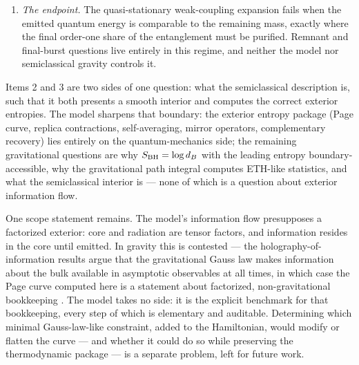 \documentclass[12pt]{article}
\newcommand{\Smicro}{S_{\rm micro}}
\begin{document}
\begin{enumerate}
the Cayley family --- would convert the per-step mixing assumption into a
derived consequence
of the dynamics and bind the complexity threshold
$\exp(\frac{1}{2}\Smicro)$ of Corollary~\ref{cor:accessibility-complexity}
to the temperature.  Separately, recovery and mirror operators
exist but are not feasibly accessible.
Proposition~\ref{prop:mirror-complexity}
gives the explicit complexity lower bound
$\exp(\frac{1}{2}\Smicro(E))$ for the radiation-supported mirror (tightened
to $\exp(\Smicro(E))$ by the Python's lunch), decreasing monotonically along
the trajectory but remaining exponential throughout the post-Page era.
Proposition~\ref{prop:no-go} and
Proposition~\ref{prop:mirror-complexity} are complementary: state independence
is forbidden algebraically, and state-dependent implementation costs
exponentially.
\item
\emph{The endpoint.}  The quasi-stationary weak-coupling expansion fails when
the emitted quantum energy is comparable to the remaining mass, exactly where
the final order-one share of the entanglement must be purified.  Remnant and
final-burst questions live entirely in this regime, and neither the model nor
semiclassical gravity controls it.
\end{enumerate}

Items 2 and 3 are two sides of one question: what the semiclassical
description is, such that it both presents a smooth interior and computes the
correct exterior entropies.  The model sharpens that boundary: the exterior
entropy package (Page curve, replica contractions, self-averaging, mirror
operators, complementary recovery) lies entirely on the quantum-mechanics
side; the remaining gravitational questions are why $S_{\rm BH}=\log d_B$
with the leading entropy boundary-accessible, why the gravitational path
integral computes ETH-like statistics, and what the semiclassical interior
is --- none of which is a question about exterior information flow.

One scope statement remains.  The model's information flow presupposes a
factorized exterior: core and radiation are tensor factors, and
information resides in the core until emitted.  In gravity this is
contested --- the holography-of-information results argue that the
gravitational Gauss law makes information about the bulk available in
asymptotic observables at all times, in which case the Page curve
computed here is a statement about factorized, non-gravitational
bookkeeping \cite{Raju2022}.  The model takes no side: it is the
explicit benchmark for that bookkeeping, every step of which is
elementary and auditable.  Determining which minimal Gauss-law-like
constraint, added to the Hamiltonian, would modify or flatten the curve
--- and whether it could do so while preserving the thermodynamic
package --- is a separate problem, left for future work.
\end{document}
